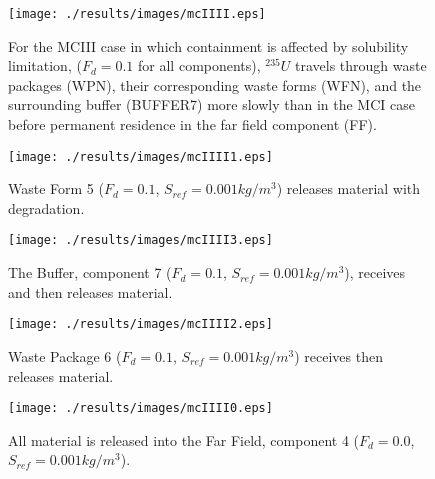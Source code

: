 
\begin{figure}[ht]
\centering
\texttt{[image: ./results/images/mcIIII.eps]}
\caption[$^{235}U$ residence. Mixed Cell Coupled Sorption and Solubility Limitation.]{
For the MCIII case in which containment is affected by solubility limitation,
        ($F_{d}=0.1$ for all components), $^{235}U$ travels through waste 
        packages (WPN), their corresponding waste forms (WFN), and the surrounding 
        buffer (BUFFER7) more slowly than in the MCI case
        before permanent residence in the far field component (FF).
}
\label{fig:mcIIIIall}
\begin{minipage}[b]{0.45\linewidth}

  \texttt{[image: ./results/images/mcIIII1.eps]}
  \caption[Case MCIII Waste Form Contaminants.]{
    Waste Form 5 ($F_d = 0.1$, $S_{ref} = 0.001kg/m^3$) releases material with degradation.
    }
  \label{fig:mcIIIIwf5}

  \texttt{[image: ./results/images/mcIIII3.eps]}
  \caption[Case MCIII Buffer Contaminants]{
    The Buffer, component 7 ($F_d=0.1$, $S_{ref}=0.001kg/m^3$), receives and then releases material.
    }
  \label{fig:mcIIIIbuff}

\end{minipage}
\hspace{0.05\linewidth}
\begin{minipage}[b]{0.45\linewidth}
  \texttt{[image: ./results/images/mcIIII2.eps]}
  \caption[Case MCIII Waste Package Contaminants.]{
    Waste Package 6 ($F_d = 0.1$, $S_{ref}=0.001kg/m^3$) receives then releases material.
    }
  \label{fig:mcIIIIwp6}

  \texttt{[image: ./results/images/mcIIII0.eps]}
  \caption[Case MCIII Waste Package Contaminants.]{All material is released into
    the Far Field, component 4 ($F_d=0.0$, $S_{ref} = 0.001kg/m^3$).}
  \label{fig:mcIII}


  \end{minipage}
\end{figure}

